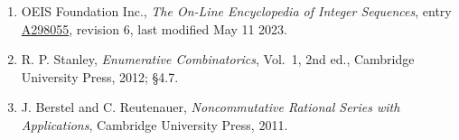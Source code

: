 \documentclass[11pt]{article}
\theoremstyle{definition}
\begin{document}
\begin{enumerate}

\item OEIS Foundation Inc., \emph{The On-Line Encyclopedia of Integer Sequences}, entry \href{https://oeis.org/A298055}{A298055}, revision 6, last modified May 11 2023.

\item R. P. Stanley, \emph{Enumerative Combinatorics}, Vol.~1, 2nd ed., Cambridge University Press, 2012; \S4.7.

\item J. Berstel and C. Reutenauer, \emph{Noncommutative Rational Series with Applications}, Cambridge University Press, 2011.

\end{enumerate}
\end{document}
